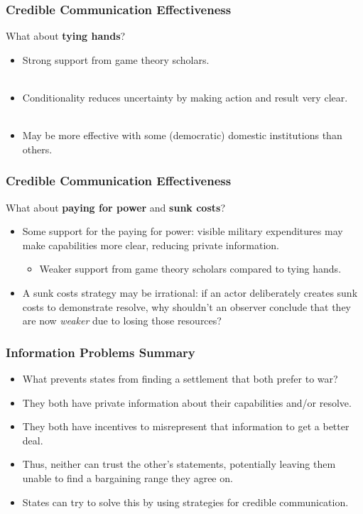 \documentclass{beamer}
\begin{document}
\begin{frame} 
	\frametitle{\LARGE{Credible Communication Effectiveness}}
	What about \textbf{tying hands}? \pause
	\begin{itemize}
		\item Strong support from game theory scholars. \pause
		\\~\\
		\item Conditionality reduces uncertainty by making action and result very clear. \pause
		\\~\\
		\item May be more effective with some (democratic) domestic institutions than others.
	\end{itemize}
\end{frame}

\begin{frame} 
	\frametitle{\LARGE{Credible Communication Effectiveness}}
	What about \textbf{paying for power} and \textbf{sunk costs}? \pause
	\begin{itemize}
		\item Some support for the paying for power: visible military expenditures may make capabilities more clear, reducing private information. \pause
		\begin{itemize}
			\item Weaker support from game theory scholars compared to tying hands. \pause
		\end{itemize}
		\item A sunk costs strategy may be irrational: if an actor deliberately creates sunk costs to demonstrate resolve, why shouldn't an observer conclude that they are now \textit{weaker} due to losing those resources?
	\end{itemize}
\end{frame}

\begin{frame} 
	\frametitle{\LARGE{Information Problems Summary}}
	\begin{itemize}
		\item What prevents states from finding a settlement that both prefer to war?
		\item They both have private information about their capabilities and/or resolve.
		\item They both have incentives to misrepresent that information to get a better deal.
		\item Thus, neither can trust the other's statements, potentially leaving them unable to find a bargaining range they agree on.
		\item States can try to solve this by using strategies for credible communication.
	\end{itemize}
\end{frame}
\end{document}
